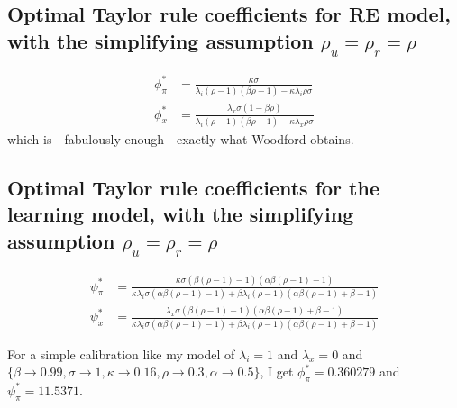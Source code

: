 \documentclass[11pt]{article}
\renewcommand{\[}{\begin{equation}}
\renewcommand{\]}{\end{equation}}
\begin{document}
\newpage
\subsection{Optimal Taylor rule coefficients for RE model, with the simplifying assumption $\rho_u = \rho_r = \rho$}
\begin{align}
\phi_{\pi}^* & = \frac{\kappa  \sigma }{\lambda_i(\rho -1) (\beta  \rho -1)-\kappa  \lambda_i \rho  \sigma }
\\
\phi_{x}^* & =  \frac{\lambda_x\sigma  (1-\beta  \rho )}{\lambda_i (\rho -1) (\beta  \rho -1)-\kappa  \lambda_x \rho  \sigma }
\end{align}
which is - fabulously enough - exactly what Woodford obtains.
\subsection{Optimal Taylor rule coefficients for the learning model, with the simplifying assumption $\rho_u = \rho_r = \rho$}
\begin{align}
\psi_{\pi}^* & =
\frac{\kappa  \sigma  (\beta  (\rho -1)-1) (\alpha  \beta  (\rho -1)-1)}{\kappa  \lambda_i \sigma  (\alpha  \beta  (\rho -1)-1)+\beta  \lambda_i (\rho -1) (\alpha  \beta  (\rho -1)+\beta -1)} \\
\psi_{x}^* & = 
\frac{\lambda_x\sigma  (\beta  (\rho -1)-1) (\alpha  \beta  (\rho -1)+\beta -1)}{\kappa  \lambda_i \sigma  (\alpha  \beta  (\rho -1)-1)+\beta  \lambda_i (\rho -1) (\alpha  \beta  (\rho -1)+\beta -1)}
\end{align}

For a simple calibration like my model of $\lambda_i =1$ and $\lambda_x=0$ and
$\{\beta \to 0.99,\sigma \to 1,\kappa \to 0.16,\rho \to 0.3,\alpha \to 0.5\}$, I get $\phi_{\pi}^*=0.360279$ and $\psi_{\pi}^*=11.5371$.
\end{document}
